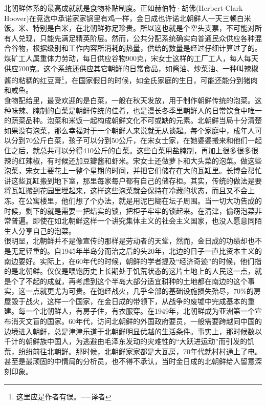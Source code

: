 北朝鲜体系的最高成就就是食物补贴制度。正如赫伯特·胡佛(Herbert Clark Hoover)在竞选中承诺家家锅里有鸡一样，金日成也许诺北朝鲜人一天三顿白米饭。米、特别是白米，在北朝鲜弥足珍贵。所以这也就是个空头支票，不可能对所有人兑现，只能先满足精英阶层。然而，公共分配系统确实向普通民众供应各种混合谷物，根据级别和工作内容所消耗的热量，供给的数量是经过仔细计算过了的。煤矿工人属重体力劳动，每日供应谷物900克，宋女士这样的工厂工人，每人每天供应700克。这个系统还供应其它朝鲜的日常食品，如酱油、炒菜油、一种叫辣椒酱的粘稠的红豆膏\footnote{这里应是作者有误。──译者}，在国家假日的时候，如金氏家庭的生日，可能还能分到猪肉和咸鱼。\\

食物配给里，最受欢迎的是白菜，一般在秋天发放，用于制作朝鲜传统的泡菜。这种味辣、腌制的白菜是朝鲜传统的佳肴，也是漫长冬季里朝鲜人的日常饮食中唯一的蔬菜品种。泡菜和米饭一起构成朝鲜文化不可或缺的元素。北朝鲜当局十分清楚如果没有泡菜，那么幸福对于一个朝鲜人来说就无从谈起。每个家庭中，成年人可以分到70公斤白菜，孩子可以分到50公斤，在宋女士家，在她婆婆搬来和他们一起住之后，就总共可以分得410公斤的白菜。这些白菜用盐腌制，再加上很多很多很辣的红辣椒，有时候还加豆瓣酱和虾米。宋女士还做萝卜和大头菜的泡菜。做这些泡菜，宋女士要花上一整个星期的时间，并把它们储存在大的瓦缸里。长博会帮忙讲这些瓦缸搬到地下室，那里每家每户都有自己的储存柜。其实，传统的做法是要将瓦缸搬到花园里埋起来，这样这些泡菜就会保持在冷藏的状态，而且又不会上冻。在公寓楼里，他们想了个办法，就是用泥巴糊在坛子周围。当一切大功告成的时候，剩下的就是需要一把结实的锁，把柜子牢牢的锁起来。在清津，偷窃泡菜非常普遍。即使在如北朝鲜这样一个讲究集体主义的社会主义国家，也没人愿意同陌生人分享自己的泡菜。\\

很明显，北朝鲜并不是像宣传的那样是劳动者的天堂，然而，金日成的功绩却也不是无足轻重的。自1945年半岛分而治之后的头20年，北边的日子一直比资本主义的南边要好。实际上，在60年代的时候，朝鲜的学者提及“经济奇迹”的时候，他们指的是北朝鲜。仅仅是喂饱历史上长期处于饥荒状态的这片土地上的人民这一点，就是个了不起的成就，再考虑到这个半岛大部分适宜耕种的土地都在南边的这个事实，这一点就更尤为可贵。在饱经战火，几乎全部的基础设施损失殆尽，70\%的房屋毁于战火，这样一个国家，在金日成的带领下，从战争的废墟中完成基本的重建。每一个北朝鲜人，有房子住，有衣服穿。在1949年，北朝鲜成为亚洲第一个宣布消灭文盲的国家。60年代，访问北朝鲜的外国政府要员，一般需要跨越同中国的边境进入朝鲜，总是津津乐道于北朝鲜明显优越的生活条件。事实上，那时候数以千计的朝鲜族中国人，为逃避由毛泽东发动的灾难性的“大跃进运动”而引发的饥荒，纷纷前往北朝鲜。那时候，北朝鲜家家都是大瓦房，70年代就村村通上了电。甚至是最顽固的中情局的分析员，也不得不承认，当时金日成的北朝鲜给人留意深刻印象。\\

